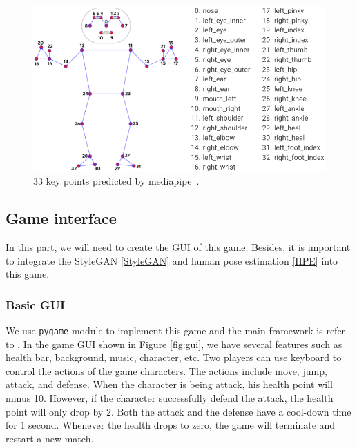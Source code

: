\begin{figure}[ht]
    \centering
    \includegraphics[scale=.3]{fig/medpose.png}
    \caption{33 key points predicted by mediapipe~\cite{lugaresi2019mediapipe}.}
    \label{fig:medpose}
\end{figure}


\subsection{Game interface}
In this part, we will need to create the GUI of this game.
Besides, it is important to integrate the StyleGAN \ref{StyleGAN} and  human pose estimation \ref{HPE} into this game.



\subsubsection{Basic GUI}

We use \texttt{pygame} module to implement this game and the main framework is refer to \cite{GUI_framework}. In the game GUI shown in Figure \ref{fig:gui}, we have several features such as health bar, background, music, character, etc. Two players can use keyboard to control the actions of the game characters. The actions include move, jump, attack, and defense. When the character is being attack, his health point will minus 10. However, if the character successfully defend the attack, the health point will only drop by 2. Both the attack and the defense have a cool-down time for 1 second. Whenever the health drops to zero, the game will terminate and restart a new match.

